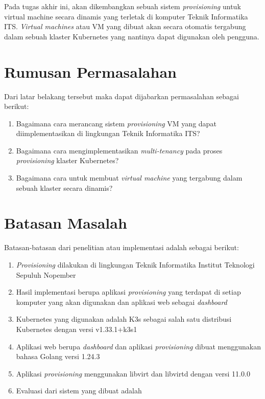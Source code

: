 Pada tugas akhir ini, akan dikembangkan sebuah sistem \emph{provisioning} untuk virtual machine
secara dinamis yang terletak di komputer Teknik Informatika ITS. \emph{Virtual machines} atau VM
yang dibuat akan secara otomatis tergabung dalam sebuah klaster Kubernetes yang nantinya
dapat digunakan oleh pengguna.

\section{Rumusan Permasalahan}
\label{sec:rumusanpermasalahan}

Dari latar belakang tersebut maka dapat dijabarkan permasalahan sebagai berikut:

\begin{enumerate}[nolistsep]

  \item Bagaimana cara merancang sistem \emph{provisioning} VM yang dapat diimplementasikan
    di lingkungan Teknik Informatika ITS?

  \item Bagaimana cara mengimplementasikan \emph{multi-tenancy} pada proses \emph{provisioning}
    klaster Kubernetes?

  \item Bagaimana cara untuk membuat \emph{virtual machine} yang tergabung
    dalam sebuah klaster secara dinamis?

\end{enumerate}

\section{Batasan Masalah}
\label{sec:batasanmasalah}

Batasan-batasan dari penelitian atau implementasi adalah sebagai berikut:

\begin{enumerate}[nolistsep]

  \item \emph{Provisioning} dilakukan di lingkungan Teknik Informatika Institut
    Teknologi Sepuluh Nopember

  \item Hasil implementasi berupa aplikasi \emph{provisioning} yang terdapat di setiap
    komputer yang akan digunakan dan aplikasi web sebagai \emph{dashboard}

  \item Kubernetes yang digunakan adalah K3s sebagai salah satu distribusi
    Kubernetes dengan versi v1.33.1+k3s1

  \item Aplikasi web berupa \emph{dashboard} dan aplikasi \emph{provisioning} dibuat
    menggunakan bahasa Golang versi 1.24.3

  \item Aplikasi \emph{provisioning} menggunakan libvirt dan libvirtd dengan versi 11.0.0

  \item Evaluasi dari sistem yang dibuat adalah 

\end{enumerate}

